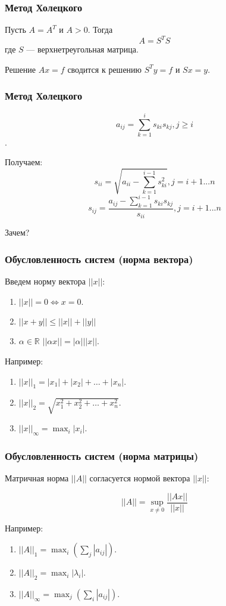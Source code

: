 \documentclass[10pt]{beamer}
\begin{document}
\begin{frame}[fragile]
\frametitle{Метод Холецкого}

Пусть $A = A^{T}$ и $A > 0$. Тогда
$$ A = S^T S$$
где $S$ --- верхнетреугольная матрица.

\vfill

Решение $Ax = f$ сводится к решению $S^{T} y = f$ и $S x = y$.
\end{frame}

\begin{frame}[fragile]
\frametitle{Метод Холецкого}

$$a_{i j} = \sum_{k=1}^{i} s_{ki} s_{kj}, j \geqslant i$$.

Получаем:
$$s_{i i} = \sqrt{a_{ii} - \sum_{k=1}^{i-1} s_{ki}^2}, j = i + 1 ... n$$
$$s_{i j} = \frac{a_{ij} - \sum_{k=1}^{i-1} s_{ki} s_{kj}}{s_{ii}}, j = i + 1 ... n$$

Зачем?
\end{frame}

\begin{frame}[fragile]
\frametitle{Обусловленность систем (норма вектора)}

Введем норму вектора $||x||$:

\begin{enumerate}
\item $||x|| = 0 \Leftrightarrow x = 0$.
\item $||x + y|| \leqslant ||x|| + ||y||$
\item $ \alpha \in \mathbb{R}$ $||\alpha x|| = |\alpha| ||x||$.
\end{enumerate}

Например:
\begin{enumerate}
\item $||x||_1 = |x_1| + |x_2| + \ldots + |x_n|$.
\item $||x||_2 = \sqrt{x_1^2 + x_2^2 + \ldots + x_n^2}$.
\item $||x||_{\infty} = \max_i |x_i|$.
\end{enumerate}
\end{frame}

\begin{frame}[fragile]
\frametitle{Обусловленность систем (норма матрицы)}

Матричная норма $||A||$ согласуется нормой вектора $||x||$:

$$ 
||A|| = \sup_{x \neq 0} \frac{||Ax||}{||x||}
$$

Например:
\begin{enumerate}
\item $||A||_1 = \max_i \left( \sum_j |a_{ i j }| \right)$.
\item $||A||_2 = \max_i |\lambda_i|$.
\item $||A||_{\infty} = \max_j \left( \sum_i |a_{ i j }| \right)$.
\end{enumerate}
\end{frame}
\end{document}
